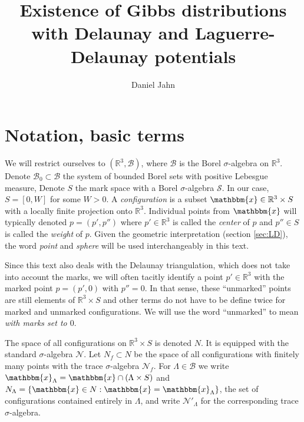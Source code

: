 \documentclass[12pt,a4paper]{article}
\title{Existence of Gibbs distributions with Delaunay and Laguerre-Delaunay potentials}
\author{Daniel Jahn}
\newcommand{\R}{{\mathbb R^3}}
\theoremstyle{definition}
\theoremstyle{remark}
\theoremstyle{theorem}
\newcommand{\x}{\mathbbm{x}}
\begin{document}
\maketitle
\tableofcontents

\section{Notation, basic terms}

We will restrict ourselves to $(\mathbb R^3, \mathcal B)$, where $\mathcal B$ is the Borel $\sigma$-algebra on $\R$. Denote $\mathcal B_0 \subset \mathcal B$ the system of bounded Borel sets with positive Lebesgue measure, Denote $S$ the mark space with a Borel $\sigma$-algebra $\mathcal S$. In our case, $S = [0,W]$ for some $W>0$. A \textit{configuration} is a subset $\x \in \mathbb R^3\times S$ with a locally finite projection onto $\mathbb R^3$. Individual points from $\x$ will typically denoted $p=(p',p'')$ where $p' \in \mathbb R^3$ is called the \textit{center} of $p$ and $p'' \in S$ is called the \textit{weight} of $p$. Given the geometric interpretation (section \ref{sec:LD}),  the word \textit{point} and \textit{sphere} will be used interchangeably in this text.

Since this text also deals with the Delaunay triangulation, which does not take into account the marks, we will often tacitly identify a point $p'\in\R$ with the marked point $p=(p',0)$ with $p''=0$. In that sense, these ``unmarked'' points are still elements of $\R\times S$ and other terms do not have to be define twice for marked and unmarked configurations. We will use the word ``unmarked'' to mean \textit{with marks set to $0$}.  

The space of all configurations on $\mathbb R^3 \times S$ is denoted $N$. It is equipped with the standard $\sigma$-algebra $\mathcal N$. Let $N_f \subset N$ be the space of all configurations with finitely many points with the trace $\sigma$-algebra $\mathcal N_f$. For $\Lambda\in\mathcal B$ we write $\x_{\Lambda} = \x \cap (\Lambda \times S)$ and $N_\Lambda = \{\x \in N: \x = \x_\Lambda\}$, the set of configurations contained entirely in $\Lambda$, and write  $\mathcal N'_\Lambda$ for the corresponding trace $\sigma$-algebra.
\end{document}
